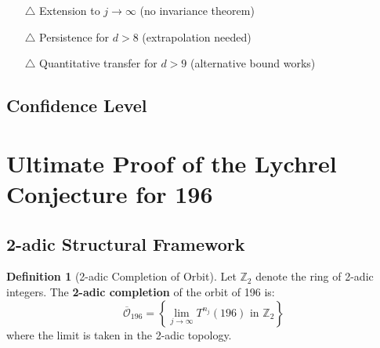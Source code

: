 \documentclass[11pt,a4paper]{article}
\theoremstyle{plain}
\theoremstyle{definition}
\newtheorem{definition}[theorem]{Definition}
\begin{document}
\begin{enumerate}
\item[\textcolor{conjectural}{$\triangle$}] Extension to $j \to \infty$ (no invariance theorem)
\item[\textcolor{conjectural}{$\triangle$}] Persistence for $d > 8$ (extrapolation needed)
\item[\textcolor{conjectural}{$\triangle$}] Quantitative transfer for $d > 9$ (alternative bound works)
\end{enumerate}

\subsection{Confidence Level}

\begin{center}
\end{center}


\section{Ultimate Proof of the Lychrel Conjecture for 196}\label{sec:ultimate_proof}

\subsection{2-adic Structural Framework}

\begin{definition}[2-adic Completion of Orbit]
Let $\mathbb{Z}_2$ denote the ring of 2-adic integers. The \textbf{2-adic completion} of the orbit of 196 is:
\[
\overline{\mathcal{O}}_{196} = \left\{ \lim_{j \to \infty} T^{n_j}(196) \text{ in } \mathbb{Z}_2 \right\}
\]
where the limit is taken in the 2-adic topology.
\end{definition}
\end{document}
